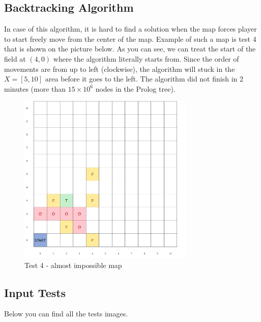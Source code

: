 \documentclass{article}
\begin{document}
\subsection{Backtracking Algorithm}
In case of this algorithm, it is hard to find a solution when the map forces player to start freely move from the center of the map. Example of such a map is test 4 that is shown on the picture below. As you can see, we can treat the start of the field at $(4, 0)$ where the algorithm literally starts from. Since the order of movements are from up to left (clockwise), the algorithm will stuck in the $X = [5, 10]$ area before it goes to the left. The algorithm did not finish in 2 minutes (more than $15 \times 10^6$ nodes in the Prolog tree).
\begin{figure}[ht]
        \centering
        \includegraphics[width=0.75\textwidth]{images/image3.png}
        \caption{Test 4 - almost impossible map}
        \label{fig:test7}
\end{figure}
\begin{appendices}
\section{Input Tests}
\label{appendix:tests}
Below you can find all the tests images.
\end{appendices}
\end{document}
